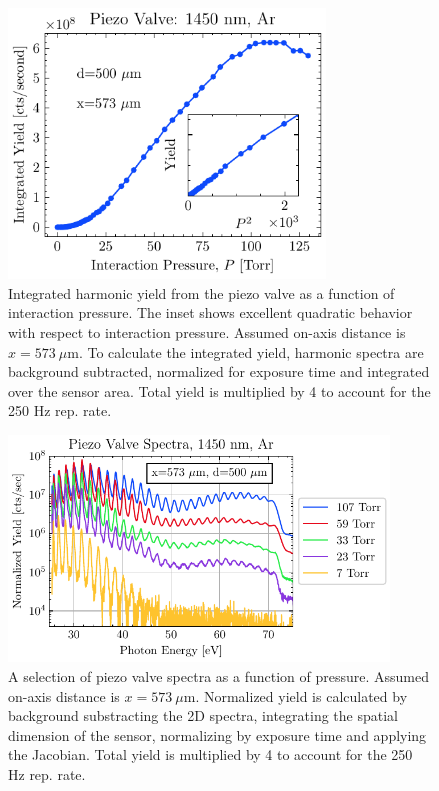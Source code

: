 \begin{figure}
	\centering
	\includegraphics[width=0.75\textwidth]{figures/chap3/piezovalve_pscan.pdf}
	\caption{Integrated harmonic yield from the piezo valve as a function of interaction pressure. The inset shows excellent quadratic behavior with respect to interaction pressure. Assumed on-axis distance is $x = 573 \ \mu \textrm{m}$. To calculate the integrated yield, harmonic spectra are background subtracted, normalized for exposure time and integrated over the sensor area. Total yield is multiplied by 4 to account for the 250 Hz rep. rate.}
	\label{fig:piezovalve_pscan}
\end{figure}

\begin{figure}
	\centering
	\includegraphics[width=0.9\textwidth]{figures/chap3/piezovalve_spectra.pdf}
	\caption{A selection of piezo valve spectra as a function of pressure. Assumed on-axis distance is $x = 573 \ \mu \textrm{m}$. Normalized yield is calculated by background substracting the 2D spectra, integrating the spatial dimension of the sensor, normalizing by exposure time and applying the Jacobian. Total yield is multiplied by 4 to account for the 250 Hz rep. rate.}
	\label{fig:piezovalve_spectra}
\end{figure}

